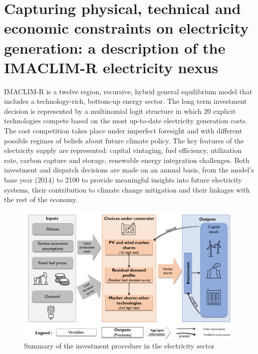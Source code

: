 \section*{Capturing physical, technical and economic constraints on electricity generation: a description of the IMACLIM-R electricity nexus}

IMACLIM-R is a twelve region, recursive, hybrid general equilibrium model that includes a technology-rich, bottom-up energy sector.  The long term investment decision is represented by a multinomial logit structure in which 20 explicit technologies compete based on the most up-to-date electricity generation costs. The cost competition takes place under imperfect foresight and with different possible regimes of beliefs about future climate policy. The key features of the electricity supply are represented: capital vintaging, fuel efficiency, utilization rate, carbon capture and storage, renewable energy integration challenges.  Both investment and dispatch decisions are made on an annual basis, from the model's base year (2014) to 2100 to provide meaningful insights into future electricity systems, their contribution to climate change mitigation and their linkages with the rest of the economy.

\begin{figure}[H]
    \centerline{\includegraphics[scale=0.55]{figures&tables/Summary_nexus.png}} %
    \caption{Summary of the investment procedure in the electricity sector}
    \label{fig:suminv}
\end{figure}

